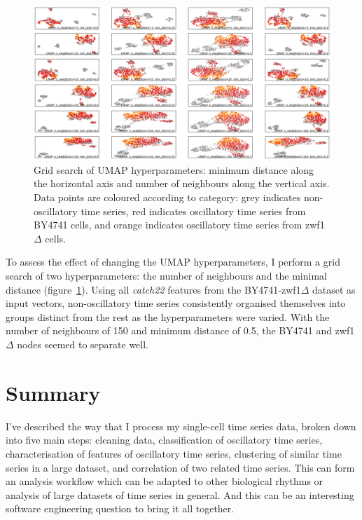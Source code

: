 \begin{figure}
  \centering
    \includegraphics[width=0.9\linewidth]{IdenFeatures_20016_UMAP_22_cropped}
    \caption{
      Grid search of UMAP hyperparameters: minimum distance along the horizontal axis and number of neighbours along the vertical axis.
      Data points are coloured according to category: grey indicates non-oscillatory time series, red indicates oscillatory time series from BY4741 cells, and orange indicates oscillatory time series from zwf1$\Delta$ cells.
    }
  \label{fig:umap-gridsearch}
\end{figure}

To assess the effect of changing the UMAP hyperparameters, I perform a grid search of two hyperparameters: the number of neighbours and the minimal distance (figure~\ref{fig:umap-gridsearch}).
Using all \textit{catch22} features from the BY4741-zwf1$\Delta$ dataset as input vectors, non-oscillatory time series consistently organised themselves into groups distinct from the rest as the hyperparameters were varied.
With the number of neighbours of 150 and minimum distance of 0.5, the BY4741 and zwf1$\Delta$ nodes seemed to separate well.

\section{Summary}
\label{sec:analysis-summary}

I've described the way that I process my single-cell time series data, broken down into five main steps: cleaning data, classification of oscillatory time series, characterisation of features of oscillatory time series, clustering of similar time series in a large dataset, and correlation of two related time series.
This can form an analysis workflow which can be adapted to other biological rhythms or analysis of large datasets of time series in general.
And this can be an interesting software engineering question to bring it all together.

